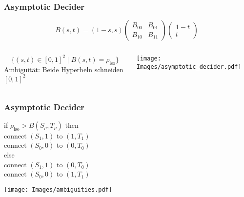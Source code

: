 \documentclass{beamer}
\begin{document}
\begin{frame}[t]
  \frametitle{Asymptotic Decider}
    \centering
    \[
    B(s, t) =
    (1 - s, s)
    \begin{pmatrix}
    B_{00} & B_{01} \\
    B_{10} & B_{11}
    \end{pmatrix}
    \begin{pmatrix}
    1 - t \\
    t
    \end{pmatrix}
    \]

\begin{columns}[c]

  \vspace{-10cm}
  \[
    \{(s, t) \in [0,1]^2 \mid B(s, t) = \rho_{\text{iso}}\}
  \]
  Ambiguität: Beide Hyperbeln schneiden $[0, 1]^2$

  \centering
  \vspace{0.2cm}
  \texttt{[image: Images/asymptotic\_decider.pdf]}

\end{columns}
\end{frame}

\begin{frame}[t]
  \frametitle{Asymptotic Decider}
  \small
  \begin{tabbing}
if $\rho_{\text{iso}} > B(S_\rho, T_\rho)$ then \\
\hspace{4ex} connect $(S_1, 1)$ to $(1, T_1)$ \\
\hspace{4ex} connect $(S_0, 0)$ to $(0, T_0)$ \\
else \\
\hspace{4ex} connect $(S_1, 1)$ to $(0, T_0)$ \\
\hspace{4ex} connect $(S_0, 0)$ to $(1, T_1)$
  \end{tabbing}

  \centering
  \texttt{[image: Images/ambiguities.pdf]}
\end{frame}
\end{document}
